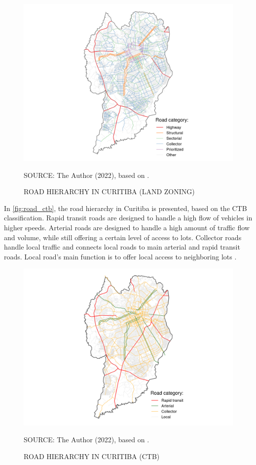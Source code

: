 \begin{figure}[!htbp]
    \centering\footnotesize
    \captionsetup{font=footnotesize}
    \caption{ROAD HIERARCHY IN CURITIBA (LAND ZONING)}
    \includegraphics{fig/road_zoning_map.png}
    \label{fig:road_cwb}
    \par SOURCE: The Author (2022), based on \textcite{IPPUC2021}.
\end{figure}

In \autoref{fig:road_ctb}, the road hierarchy in Curitiba is presented, based on the CTB classification. Rapid transit roads are designed to handle a high flow of vehicles in higher speeds. Arterial roads are designed to handle a high amount of traffic flow and volume, while still offering a certain level of access to lots. Collector roads handle local traffic and connects local roads to main arterial and rapid transit roads. Local road's main function is to offer local access to neighboring lots \cite{Brasil1997}. 

\begin{figure}[!htbp]
    \centering\footnotesize
    \captionsetup{font=footnotesize}
    \caption{ROAD HIERARCHY IN CURITIBA (CTB)}
    \includegraphics{fig/road_cwb_map.png}
    \label{fig:road_ctb}
    \par SOURCE: The Author (2022), based on \textcite{IPPUC2021}.
\end{figure}

